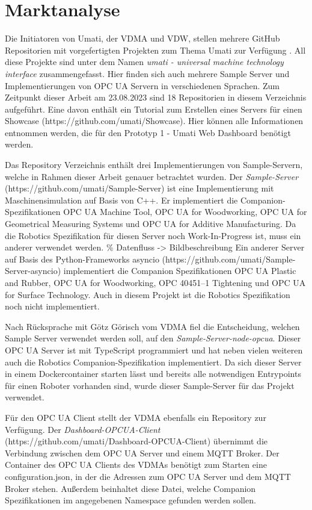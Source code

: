 \documentclass[a4paper, 12pt, oneside, toc=listofnumbered, bibliography=totoc]{scrbook}
\begin{document}
	\section{Marktanalyse}\label{Marktanalyse}
		
		Die Initiatoren von Umati, der \ac{VDMA} und \ac{VDW}, stellen mehrere GitHub Repositorien mit vorgefertigten Projekten zum Thema Umati zur Verfügung \cite{noauthor_github_nodate}. All diese Projekte sind unter dem Namen \textit{umati - universal machine technology interface} zusammengefasst. Hier finden sich auch mehrere Sample Server und Implementierungen von OPC UA Servern in verschiedenen Sprachen. Zum Zeitpunkt dieser Arbeit am 23.08.2023 sind 18 Repositorien in diesem Verzeichnis aufgeführt. Eine davon enthält ein Tutorial zum Erstellen eines Servers für einen Showcase (https://github.com/umati/Showcase). Hier können alle Informationen entnommen werden, die für den Prototyp 1 - Umati Web Dashboard benötigt werden.
		
		Das Repository Verzeichnis enthält drei Implementierungen von Sample-Servern, welche in Rahmen dieser Arbeit genauer betrachtet wurden. Der \textit{Sample-Server} \linebreak (https://github.com/umati/Sample-Server) ist eine Implementierung mit Maschinensimulation auf Basis von C++. Er implementiert die Companion-Spezifikationen OPC UA Machine Tool, OPC UA for Woodworking, OPC UA for Geometrical Measuring Systems und OPC UA for Additive Manufacturing. Da die Robotics Spezifikation für diesen Server noch Work-In-Progress ist, muss ein anderer verwendet werden.
		\% Datenfluss -> Bildbeschreibung
		Ein anderer Server auf Basis des Python-Frameworks asyncio (https://github.com/umati/Sample-Server-asyncio) implementiert die Companion Spezifikationen OPC UA Plastic and Rubber, OPC UA for Woodworking, OPC 40451–1 Tightening und OPC UA for Surface Technology. Auch in diesem Projekt ist die Robotics Spezifikation noch nicht implementiert.
		
		Nach Rücksprache mit Götz Görisch vom VDMA fiel die Entscheidung, welchen Sample Server verwendet werden soll, auf den \textit{Sample-Server-node-opcua}. Dieser OPC UA Server ist mit TypeScript programmiert und hat neben vielen weiteren auch die Robotics Companion-Spezifikation implementiert. Da sich dieser Server in einem Dockercontainer starten lässt und bereits alle notwendigen Entrypoints für einen Roboter vorhanden sind, wurde dieser Sample-Server für das Projekt verwendet.
		
		Für den OPC UA Client stellt der VDMA ebenfalls ein Repository zur Verfügung. Der \textit{Dashboard-OPCUA-Client} (https://github.com/umati/Dashboard-OPCUA-Client) übernimmt die Verbindung zwischen dem OPC UA Server und einem MQTT Broker. Der Container des OPC UA Clients des VDMAs benötigt zum Starten eine configuration.json, in der die Adressen zum OPC UA Server und dem MQTT Broker stehen. Außerdem beinhaltet diese Datei, welche Companion Spezifikationen im angegebenen Namespace gefunden werden sollen. 
		
\end{document}
